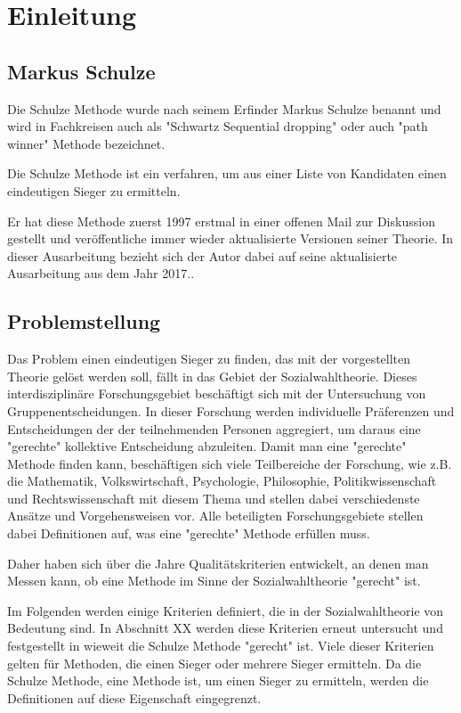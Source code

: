\section{Einleitung}
\label{sec:Einleitung}


\subsection{Markus Schulze} 
\label{sec:markusSchulze}
Die Schulze Methode wurde nach seinem Erfinder Markus Schulze benannt und wird in Fachkreisen auch als "Schwartz Sequential dropping" oder auch "path winner" Methode bezeichnet.

Die Schulze Methode ist ein verfahren, um aus einer Liste von Kandidaten einen eindeutigen Sieger zu ermitteln.

Er hat diese Methode zuerst 1997 erstmal in einer offenen Mail zur Diskussion gestellt und veröffentliche immer wieder aktualisierte Versionen seiner Theorie. In dieser Ausarbeitung bezieht sich der Autor dabei auf seine aktualisierte Ausarbeitung aus dem Jahr 2017.\citet[vgl.]{Schulze2017}.

\subsection{Problemstellung} 
\label{sec:problemstellung}
Das Problem einen eindeutigen Sieger zu finden, das mit der vorgestellten Theorie gelöst werden soll, fällt in das Gebiet der Sozialwahltheorie. Dieses interdisziplinäre Forschungsgebiet beschäftigt sich mit der Untersuchung von Gruppenentscheidungen. In dieser Forschung werden individuelle Präferenzen und Entscheidungen der der teilnehmenden Personen aggregiert, um daraus eine "gerechte" kollektive Entscheidung abzuleiten. Damit man eine "gerechte" Methode finden kann, beschäftigen sich viele Teilbereiche der Forschung, wie z.B. die Mathematik, Volkswirtschaft, Psychologie, Philosophie, Politikwissenschaft und Rechtswissenschaft mit diesem Thema und stellen dabei verschiedenste Ansätze und Vorgehensweisen vor. Alle beteiligten Forschungsgebiete stellen dabei Definitionen auf, was eine "gerechte" Methode erfüllen muss. \cite[vgl.]{scheubrein2013computerunterstuetzte}

Daher haben sich über die Jahre Qualitätskriterien entwickelt, an denen man Messen kann, ob eine Methode im Sinne der Sozialwahltheorie "gerecht" ist.

Im Folgenden werden einige Kriterien definiert, die in der Sozialwahltheorie von Bedeutung sind. In Abschnitt XX werden diese Kriterien erneut untersucht und festgestellt in wieweit die Schulze Methode "gerecht" ist. Viele dieser Kriterien gelten für Methoden, die einen Sieger oder mehrere Sieger ermitteln. Da die Schulze Methode, eine Methode ist, um einen Sieger zu ermitteln, werden die Definitionen auf diese Eigenschaft eingegrenzt.

